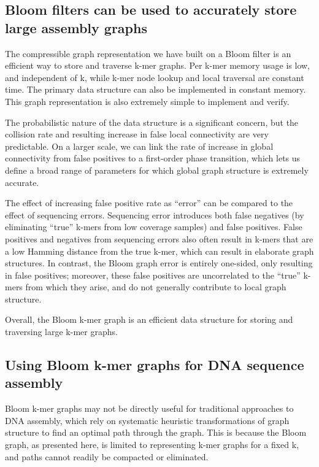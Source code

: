 \documentclass[12pt]{article} \usepackage{simplemargins}
\begin{document}
\subsection{Bloom filters can be used to accurately store large assembly
graphs}

The compressible graph representation we have built on a Bloom filter
is an efficient way to store and traverse k-mer graphs.  Per k-mer
memory usage is low, and independent of k, while k-mer node lookup and
local traversal are constant time.  The primary data structure can
also be implemented in constant memory.  This graph representation is
also extremely simple to implement and verify.

The probabilistic nature of the data structure is a significant
concern, but the collision rate and resulting increase in false local
connectivity are very predictable.  On a larger scale, we can link the
rate of increase in global connectivity from false positives to a
first-order phase transition, which lets us define a broad range of
parameters for which global graph structure is extremely accurate.

The effect of increasing false positive rate as ``error'' can be
compared to the effect of sequencing errors.  Sequencing error
introduces both false negatives (by eliminating ``true'' k-mers from
low coverage samples) and false positives.  False positives and
negatives from sequencing errors also often result in k-mers that are
a low Hamming distance from the true k-mer, which can result in
elaborate graph structures.  In contrast, the Bloom graph error is
entirely one-sided, only resulting in false positives; moreover, these
false positives are uncorrelated to the ``true'' k-mers from which
they arise, and do not generally contribute to local graph structure.

Overall, the Bloom k-mer graph is an efficient data structure for
storing and traversing large k-mer graphs.

\subsection{Using Bloom k-mer graphs for DNA sequence assembly}

Bloom k-mer graphs may not be directly useful for traditional
approaches to DNA assembly, which rely on systematic heuristic
transformations of graph structure to find an optimal path through the
graph.  This is because the Bloom graph, as presented here, is limited
to representing k-mer graphs for a fixed k, and paths cannot readily
be compacted or eliminated.
\end{document}
